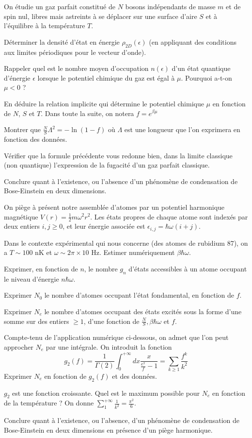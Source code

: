 On étudie un gaz parfait constitué de $N$ bosons indépendants de masse $m$ et de spin nul, libres mais astreints à se déplacer sur une surface d'aire $S$ et à l'équilibre à la température $T$.

\question
Déterminer la densité d'état en énergie $\rho_{2D}(\epsilon)$ (en appliquant des conditions aux limites périodiques pour le vecteur d'onde). 

\question
Rappeler quel est le nombre moyen d'occupation $n(\epsilon)$ d'un état quantique d'énergie $\epsilon$ lorsque le potentiel chimique du gaz est égal à $\mu$. Pourquoi a-t-on $\mu<0$ ?

\question
En déduire la relation implicite qui détermine le potentiel chimique $\mu$ en fonction de $N$, $S$ et $T$. Dans toute la suite, on notera $f=e^{\beta \mu}$

\question
Montrer que $\frac{N}{S}\Lambda^2=-\ln (1-f)$ où $\Lambda$ est une longueur que l'on exprimera en fonction des données.

\question
Vérifier que la formule précédente vous redonne bien, dans la limite classique (non quantique)
l'expression de la fugacité d'un gaz parfait classique.

\question
Conclure quant à l'existence, ou l'absence d'un phénomène de condensation de Bose-Einstein en deux dimensions.

\medskip

On piège à présent notre assemblée d'atomes par un potentiel harmonique magnétique $V(r)=\frac{1}{2}m\omega^2 r^2$. Les états propres de chaque atome sont indexés par deux entiers $i, j \geq 0$, et leur énergie associée est $\epsilon_{i,j} = \hbar \omega (i + j)$. 

\question
Dans le contexte expérimental qui nous concerne (des atomes de rubidium 87), on a  $T \sim 100$ nK et $\omega \sim 2\pi \times 10$ Hz. Estimer numériquement $\beta \hbar \omega$.

\question
Exprimer, en fonction de $n$, le nombre $g_n$ d'états accessibles à un atome
occupant le niveau d'énergie $n \hbar \omega$.

\question
Exprimer $N_0$ le nombre d'atomes occupant l'état fondamental, en fonction de $f$.

\question
Exprimer $N_e$ le nombre d'atomes occupant des états excités sous la forme d'une somme sur des entiers $\geq 1$, d'une fonction de $\frac{N}{S}, \beta \hbar \omega$ et $f$. 

\question
Compte-tenu de l'application numérique ci-dessous, on admet que l'on peut approcher $N_e$ par une intégrale. On introduit la fonction
$$
g_2(f)=\frac{1}{\Gamma(2)} \int_0^{+\infty} dx \frac{x}{\frac{e^x}{f}-1} = \sum_{k\geq 1} \frac{f^k}{k^2}
$$
Exprimer $N_e$ en fonction de $g_2(f)$ et des données.

\question
$g_2$ est une fonction croissante. Quel est le maximum possible pour $N_e$ en fonction de la température ?  On donne $\sum_1^{+\infty} \frac{1}{k^2}=\frac{\pi^2}{6}$.

\question
Conclure quant à l'existence, ou l'absence, d'un phénomène de condensation de Bose-Einstein en deux dimensions en présence d'un piège harmonique.

